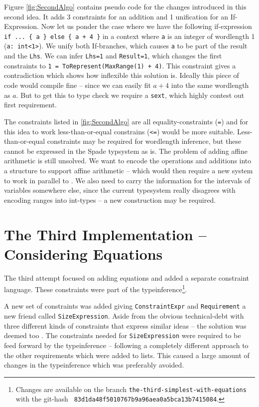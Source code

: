 Figure \ref{fig:SecondAlgo} contains pseudo code for the changes introduced in this second idea. It adds 3 constraints for an addition and 1 unification for an If-Expression. Now let us ponder the case where we have the following if-expression \verb!if ... { a } else { a + 4 }! in a context where \verb+a+ is an integer of wordlength 1 (\verb+a: int<1>+). We unify both If-branches, which causes \verb+a+ to be part of the result and the \verb+Lhs+. We can infer \verb+Lhs=1+ and \verb+Result=1+, which changes the first constraints to \verb!1 = ToRepresent(MaxRange(1) + 4)!. This constraint gives a contradiction which shows how inflexible this solution is. Ideally this piece of code would compile fine -- since we can easily fit $a + 4$ into the same wordlength as $a$. But to get this to type check we require a \verb+sext+, which highly contest out first requirement.

The constraints listed in \ref{fig:SecondAlgo} are all equality-constraints (\verb+=+) and for this idea to work less-than-or-equal constrains (\verb+<=+) would be more suitable. Less-than-or-equal constraints may be required for wordlength inference, but these cannot be expressed in the Spade typsystem as is. The problem of adding affine arithmetic is still unsolved. We want to encode the operations and additions into a structure to support affine arithmetic -- which would then require a new system to work in parallel to . We also need to carry the information for the intervals of variables somewhere else, since the current typesystem really disagrees with encoding ranges into int-types -- a new construction may be required. 

\section{The Third Implementation -- Considering Equations}
\label{sec:Third}
The third attempt focused on adding equations and added a separate constraint language. These constraints were part of the typeinference\cprotect\footnote{Changes are available on the branch \verb+the-third-simplest-with-equations+ with the git-hash \verb+ 83d1da48f5010767b9a96aea0a5bca13b7415084+.}.

A new set of constraints was added giving \verb+ConstraintExpr+ and \verb+Requirement+ a new friend called \verb+SizeExpression+. Aside from the obvious technical-debt with three different kinds of constraints that express similar ideas -- the solution was deemed too . The constraints needed for \verb+SizeExpression+ were required to be feed forward by the typeinference -- following a completely different approach to the other requirements which were added to lists. This caused a large amount of changes in the typeinference which was preferably avoided.

